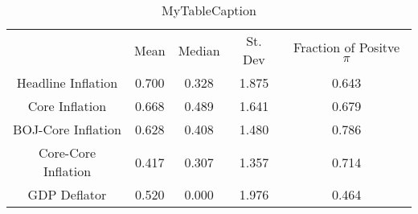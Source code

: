 \documentclass[10pt]{article}
\begin{document}
\begin{table}
\centering
\begin{tabular}{ccccc}
 & Mean & Median & St. Dev & Fraction of Positve $\pi$ \\
Headline Inflation & 0.700 & 0.328 & 1.875 & 0.643 \\
Core Inflation & 0.668 & 0.489 & 1.641 & 0.679 \\
BOJ-Core Inflation & 0.628 & 0.408 & 1.480 & 0.786 \\
Core-Core Inflation & 0.417 & 0.307 & 1.357 & 0.714 \\
GDP Deflator & 0.520 & 0.000 & 1.976 & 0.464 \\
\end{tabular}
\caption{MyTableCaption}
\label{table:MyTableLabel}
\end{table}
\end{document}
